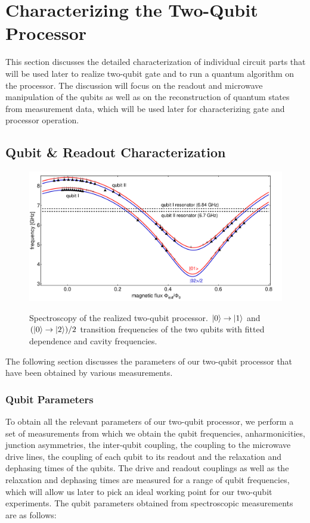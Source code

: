 \chapter{Characterizing the Two-Qubit Processor} \label{chapter:processor_characterization}

This section discusses the detailed characterization of individual circuit parts that will be used later to realize two-qubit gate and to run a quantum algorithm on the processor. The discussion will focus on the readout and microwave manipulation of the qubits as well as  on the reconstruction of quantum states from measurement data, which will be used later for characterizing gate and processor operation.

\section{Qubit \& Readout Characterization}

\begin{figure}[ht!]
	\centering
		\includegraphics[width=1.\textwidth]{"./data/ct5/qubit frequencies/qubit_spectroscopy"}
	\label{fig:ProcessorSpectroscopy}
	\caption[Spectroscopy of the Two-Qubit Processor]{Spectroscopy of the realized two-qubit processor. $\left| 0 \right>\to\left| 1 \right>$ and $(\left| 0 \right>\to\left| 2 \right>)/2$ transition frequencies of the two qubits with fitted dependence and cavity frequencies.}
\end{figure}

The following section discusses the parameters of our two-qubit processor that have been obtained by various measurements.

\subsection{Qubit Parameters}

To obtain all the relevant parameters of our two-qubit processor, we perform a set of measurements from which we obtain the qubit frequencies, anharmonicities, junction asymmetries, the inter-qubit coupling, the coupling to the microwave drive lines, the coupling of each qubit to its readout and the relaxation and dephasing times of the qubits. The drive and readout couplings as well as the relaxation and dephasing times are measured for a range of qubit frequencies, which will allow us later to pick an ideal working point for our two-qubit experiments. The qubit parameters obtained from spectroscopic measurements are as follows:

